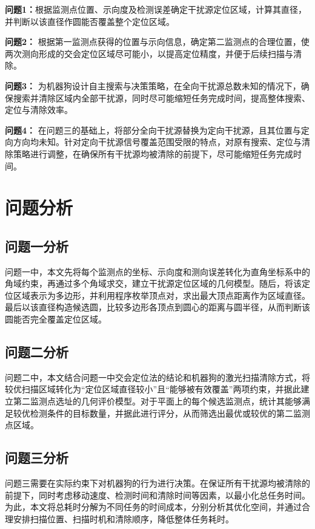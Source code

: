 \documentclass[withoutpreface,bwprint]{cumcmthesis}
\begin{document}
\textbf{问题1：}根据监测点位置、示向度及检测误差确定干扰源定位区域，计算其直径，并判断以该直径作圆能否覆盖整个定位区域。

\textbf{问题2：}  根据第一监测点获得的位置与示向信息，确定第二监测点的合理位置，使两次测向形成的交会定位区域尽可能小，以提高定位精度，并便于后续扫描与清除。

\textbf{问题3：} 为机器狗设计自主搜索与决策策略，在全向干扰源总数未知的情况下，确保搜索并清除区域内全部干扰源，同时尽可能缩短任务完成时间，提高整体搜索、定位与清除效率。

\textbf{问题4：}  在问题三的基础上，将部分全向干扰源替换为定向干扰源，且其位置与定向方向均未知。针对定向干扰源信号覆盖范围受限的特点，对原有搜索、定位与清除策略进行调整，在确保所有干扰源均被清除的前提下，尽可能缩短任务完成时间。

















\newpage
\section{问题分析}
\subsection{问题一分析}
问题一中，本文先将每个监测点的坐标、示向度和测向误差转化为直角坐标系中的角域约束，再通过多个角域求交，建立干扰源定位区域的几何模型。随后，将该定位区域表示为多边形，并利用程序枚举顶点对，求出最大顶点距离作为区域直径。最后以该直径构造候选圆，比较多边形各顶点到圆心的距离与圆半径，从而判断该圆能否完全覆盖定位区域。
\subsection{问题二分析}
问题二中，本文结合问题一中交会定位法的结论和机器狗的激光扫描清除方式，将较优扫描区域转化为“定位区域直径较小”且“能够被有效覆盖”两项约束，并据此建立第二监测点选址的几何评价模型。对于平面上的每个候选监测点，统计其能够满足较优检测条件的目标数量，并据此进行评分，从而筛选出最优或较优的第二监测点区域。
\subsection{问题三分析}
问题三需要在实际约束下对机器狗的行为进行决策。在保证所有干扰源均被清除的前提下，同时考虑移动速度、检测时间和清除时间等因素，以最小化总任务时间。为此，本文将总耗时分解为不同任务的时间成本，分别分析其优化空间，并通过合理安排扫描位置、扫描时机和清除顺序，降低整体任务耗时。
\end{document}
